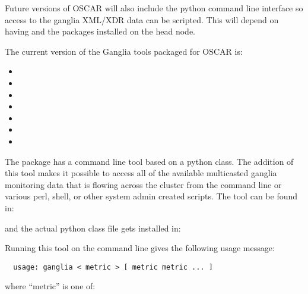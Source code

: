 Future versions of OSCAR will also include the  python
command line interface so access to the ganglia XML/XDR data can be
scripted. This will depend on having  and the
 packages installed on the head node.

The current version of the Ganglia tools packaged for OSCAR is:

\begin{itemize}
\item {}
\item {}
\item {}
\item {}
\item {}
\item {}
\item {}
\end{itemize}

The  package has a command line tool based on a python
class. The addition of this tool makes it possible to access all of
the available multicasted ganglia monitoring data that is flowing
across the cluster from the command line or various perl, shell, or
other system admin created scripts.  The tool can be found in:

\vspace{10pt}
\centerline{}
\vspace{10pt}

\noindent and the actual python class file gets installed in:

\vspace{10pt}
\centerline{}
\vspace{10pt}

Running this tool on the command line gives the following usage
message:

\begin{verbatim}
  usage: ganglia < metric > [ metric metric ... ]
\end{verbatim}

where ``metric'' is one of:


